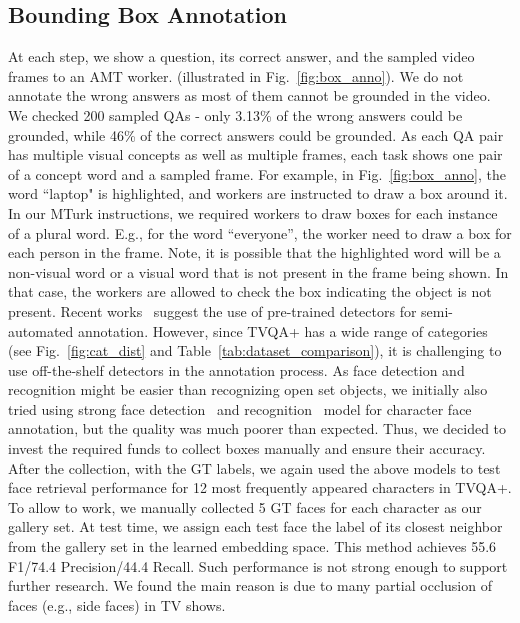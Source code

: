 \documentclass[11pt,a4paper]{article}
\begin{document}
\subsection{Bounding Box Annotation}
At each step, we show a question, its correct answer, and the sampled video frames to an AMT worker. (illustrated in Fig.~\ref{fig:box_anno}). We do not annotate the wrong answers as most of them cannot be grounded in the video. We checked 200 sampled QAs - only 3.13\% of the wrong answers could be grounded, while 46\% of the correct answers could be grounded.
As each QA pair has multiple visual concepts as well as multiple frames, each task shows one pair of a concept word and a sampled frame.
For example, in Fig.~\ref{fig:box_anno}, the word ``laptop" is highlighted, and workers are instructed to draw a box around it. 
In our MTurk instructions, we required workers to draw boxes for each instance of a plural word. 
E.g., for the word ``everyone'', the worker need to draw a box for each person in the frame.
Note, it is possible that the highlighted word will be a non-visual word or a visual word that is not present in the frame being shown. 
In that case, the workers are allowed to check the box indicating the object is not present. 
Recent works~\cite{Zellers2018FromRT,Gu2018AVAAV} suggest the use of pre-trained detectors for semi-automated annotation. 
However, since TVQA+ has a wide range of categories (see Fig.~\ref{fig:cat_dist} and Table~\ref{tab:dataset_comparison}), it is challenging to use off-the-shelf detectors in the annotation process. 
As face detection and recognition might be easier than recognizing open set objects, we initially also tried using strong face detection~\cite{zhang2016joint} and recognition~\cite{liu2017sphereface} model for character face annotation, but the quality was much poorer than expected. 
Thus, we decided to invest the required funds to collect boxes manually and ensure their accuracy. 
After the collection, with the GT labels, we again used the above models to test face retrieval performance for 12 most frequently appeared characters in TVQA+. 
To allow \cite{liu2017sphereface} to work, we manually collected 5 GT faces for each character as our gallery set. 
At test time, we assign each test face the label of its closest neighbor from the gallery set in the learned embedding space. This method achieves 55.6 F1/74.4 Precision/44.4 Recall. 
Such performance is not strong enough to support further research. 
We found the main reason is due to many partial occlusion of faces (e.g., side faces) in TV shows. 
\end{document}
